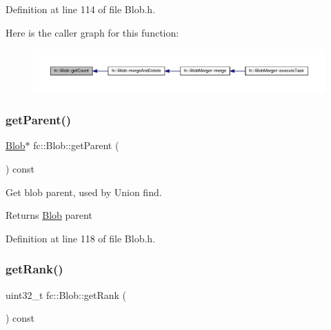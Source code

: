 Definition at line 114 of file Blob.\+h.

Here is the caller graph for this function\+:
\nopagebreak
\begin{figure}[H]
\begin{center}
\leavevmode
\includegraphics[width=350pt]{d2/d7e/classfc_1_1Blob_a7443f8362ad88c61e5dcfae2dad54d47_icgraph}
\end{center}
\end{figure}
\mbox{\label{classfc_1_1Blob_afde20e8b149cc08b56bac810177c4836}} 
\subsubsection{\texorpdfstring{get\+Parent()}{getParent()}}
{\footnotesize\ttfamily \hyperlink{classfc_1_1Blob}{Blob}$\ast$ fc\+::\+Blob\+::get\+Parent (\begin{DoxyParamCaption}{ }\end{DoxyParamCaption}) const\hspace{0.3cm}{\ttfamily [inline]}}



Get blob parent, used by Union find. 

\begin{DoxyReturn}{Returns}
\hyperlink{classfc_1_1Blob}{Blob} parent 
\end{DoxyReturn}


Definition at line 118 of file Blob.\+h.

\mbox{\label{classfc_1_1Blob_a368c9607fb6d7e032795d742eaed1539}} 
\subsubsection{\texorpdfstring{get\+Rank()}{getRank()}}
{\footnotesize\ttfamily uint32\+\_\+t fc\+::\+Blob\+::get\+Rank (\begin{DoxyParamCaption}{ }\end{DoxyParamCaption}) const\hspace{0.3cm}{\ttfamily [inline]}}



